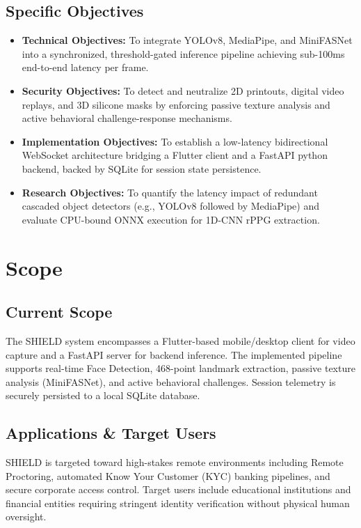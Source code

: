 \section{Specific Objectives}
\begin{itemize}
    \item \textbf{Technical Objectives:} To integrate YOLOv8, MediaPipe, and MiniFASNet into a synchronized, threshold-gated inference pipeline achieving sub-100ms end-to-end latency per frame.
    \item \textbf{Security Objectives:} To detect and neutralize 2D printouts, digital video replays, and 3D silicone masks by enforcing passive texture analysis and active behavioral challenge-response mechanisms.
    \item \textbf{Implementation Objectives:} To establish a low-latency bidirectional WebSocket architecture bridging a Flutter client and a FastAPI python backend, backed by SQLite for session state persistence.
    \item \textbf{Research Objectives:} To quantify the latency impact of redundant cascaded object detectors (e.g., YOLOv8 followed by MediaPipe) and evaluate CPU-bound ONNX execution for 1D-CNN rPPG extraction.
\end{itemize}

\chapter{Scope}

\section{Current Scope}
The SHIELD system encompasses a Flutter-based mobile/desktop client for video capture and a FastAPI server for backend inference. The implemented pipeline supports real-time Face Detection, 468-point landmark extraction, passive texture analysis (MiniFASNet), and active behavioral challenges. Session telemetry is securely persisted to a local SQLite database.

\section{Applications \& Target Users}
SHIELD is targeted toward high-stakes remote environments including Remote Proctoring, automated Know Your Customer (KYC) banking pipelines, and secure corporate access control. Target users include educational institutions and financial entities requiring stringent identity verification without physical human oversight.

